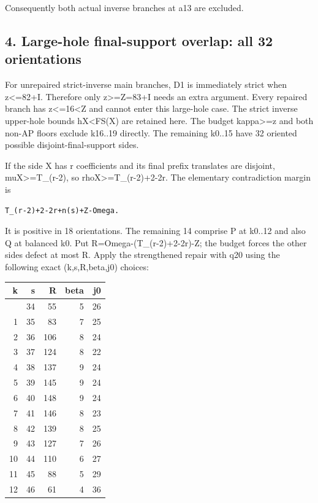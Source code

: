 \documentclass[10pt,a4paper]{article}
\theoremstyle{definition}
\begin{document}
Consequently both actual inverse branches at a13 are excluded.

\hypertarget{large-hole-final-support-overlap-all-32-orientations}{%
\subsection{4. Large-hole final-support overlap: all 32
orientations}\label{large-hole-final-support-overlap-all-32-orientations}}

For unrepaired strict-inverse main branches,\allowbreak{} D1 is immediately strict
when z\textless=\allowbreak{}82+\allowbreak{}I. Therefore only z\textgreater=\allowbreak{}Z=\allowbreak{}83+\allowbreak{}I needs an extra
argument. Every repaired branch has z\textless=\allowbreak{}16\textless Z and cannot
enter this large-hole case. The strict inverse upper-hole bounds
hX\textless\textbar FS(X) are retained here. The budget
kappa\textgreater=\allowbreak{}z and both non-AP floors exclude k16..19 directly. The
remaining k0..15 have 32 oriented possible disjoint-final-support sides.

If the side X has r coefficients and its final prefix translates are
disjoint,\allowbreak{} muX\textgreater=\allowbreak{}T\_\allowbreak{}(r-2),\allowbreak{} so rhoX\textgreater=\allowbreak{}T\_\allowbreak{}(r-2)+\allowbreak{}2-2r.
The elementary contradiction margin is

\begin{lstlisting}
T_(r-2)+2-2r+n(s)+Z-Omega.
\end{lstlisting}

It is positive in 18 orientations. The remaining 14 comprise P at k0..12
and also Q at balanced k0. Put R=\allowbreak{}Omega-(T\_\allowbreak{}(r-2)+\allowbreak{}2-2r)-Z; the budget
forces the other side\textquotesingle s defect at most R. Apply the
strengthened repair with q20 using the following exact (k,\allowbreak{}s,\allowbreak{}R,\allowbreak{}beta,\allowbreak{}j0)
choices:

\begin{longtable}[]{@{}rrrrr@{}}
\toprule\noalign{}
k & s & R & beta & j0 \\
\midrule\noalign{}
\endhead
\bottomrule\noalign{}
\endlastfoot
0 & 34 & 55 & 5 & 26 \\
1 & 35 & 83 & 7 & 25 \\
2 & 36 & 106 & 8 & 24 \\
3 & 37 & 124 & 8 & 22 \\
4 & 38 & 137 & 9 & 24 \\
5 & 39 & 145 & 9 & 24 \\
6 & 40 & 148 & 9 & 24 \\
7 & 41 & 146 & 8 & 23 \\
8 & 42 & 139 & 8 & 25 \\
9 & 43 & 127 & 7 & 26 \\
10 & 44 & 110 & 6 & 27 \\
11 & 45 & 88 & 5 & 29 \\
12 & 46 & 61 & 4 & 36 \\
\end{longtable}
\end{document}
